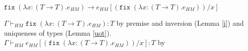 \begin{case}
$\mathtt{fix}\;(\lambda x:(T\rightarrow T).e_{HM})\rightarrow e_{HM}[(\mathtt{fix}\;(\lambda x:(T\rightarrow T).e_{HM}))/x]$

$\Gamma\vdash_{HM}\mathtt{fix}\;(\lambda x:(T\rightarrow T).e_{HM}):T$ by premise and inversion (Lemma \ref{i}) and uniqueness of types (Lemma \ref{uot}).  $\Gamma\vdash_{HM}e_{HM}[(\mathtt{fix}\;(\lambda x:(T\rightarrow T).e_{HM}))/x]:T$ by 
\end{case}
